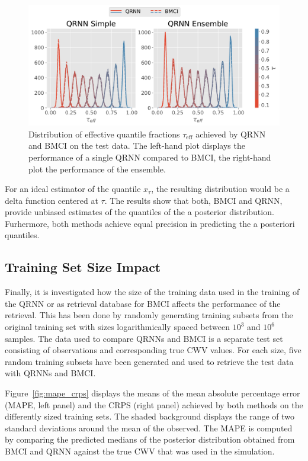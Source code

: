 \documentclass[journal abbreviation, manuscript]{copernicus}
\begin{document}
  \begin{figure}[hbpt!]
    \centering
    \includegraphics[width = 0.8\linewidth]{../plots/quantile_fractions}
    \caption{Distribution of effective quantile fractions $\tau_\text{eff}$ achieved by
      QRNN and BMCI on the test data. The left-hand plot displays the performance of a
      single QRNN compared to BMCI, the right-hand plot the performance of the ensemble.}
    \label{fig:quantile_fractions}
  \end{figure}

  For an ideal estimator of the quantile $x_\tau$, the resulting distribution
  would be a delta function centered at $\tau$. The results show that both, BMCI
  and QRNN, provide unbiased estimates of the quantiles of the a posterior
  distribution. Furhermore, both methods achieve equal precision in predicting
  the a posteriori quantiles.

\subsection{Training Set Size Impact}

Finally, it is investigated how the size of the training data used in the
training of the QRNN or as retrieval database for BMCI affects the performance
of the retrieval. This has been done by randomly generating training subsets
from the original training set with sizes logarithmically spaced between $10^3$
and $10^6$ samples. The data used to compare QRNNs and BMCI is a separate test
set consisting of observations and corresponding true CWV values. For each size,
five random training subsets have been generated and used to retrieve the test
data with QRNNs and BMCI.

Figure~\ref{fig:mape_crps} displays the means of the mean absolute percentage
error (MAPE, left panel) and the CRPS (right panel) achieved by both methods on
the differently sized training sets. The shaded background displays the range of
two standard deviations around the mean of the observed. The MAPE is computed by
comparing the predicted medians of the posterior distribution obtained from BMCI
and QRNN against the true CWV that was used in the simulation.
\end{document}
